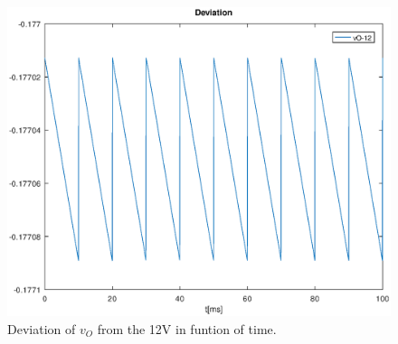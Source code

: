 \begin{figure}[H] \centering
\includegraphics[width=0.8 \linewidth]{vdeviation.eps}
\caption{Deviation of $v_O$ from the 12V in funtion of time.}
\label{fig:env}
\end{figure}




